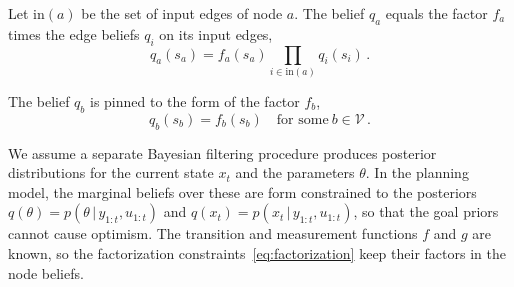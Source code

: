 \documentclass{l4dc2027}
\newcommand\given[1][]{\,#1\vert\,}
\begin{document}
\begin{definition}\label{def:factorization}
Let $\mathrm{in}(a)$ be the set of input edges of node $a$. The belief $q_a$ equals the factor $f_a$ times the edge beliefs $q_i$ on its input edges,
\begin{equation}\label{eq:factorization}
	q_a(s_a) = f_a(s_a) \prod_{i \in \mathrm{in}(a)} q_i(s_i) \, .
\end{equation}
\end{definition}
%
\begin{definition}\label{def:form}
The belief $q_b$ is pinned to the form of the factor $f_b$,
\begin{equation}\label{eq:form}
	q_b(s_b) = f_b(s_b)  \quad \text{for some} \ b \in \mathcal{V} \, .
\end{equation}
\end{definition}
%
We assume a separate Bayesian filtering procedure produces posterior distributions for the current state $x_t$ and the parameters $\theta$. In the planning model, the marginal beliefs over these are form constrained to the posteriors $q(\theta) = p(\theta \given y_{1:t}, u_{1:t})$ and $q(x_t) = p(x_t \given y_{1:t}, u_{1:t})$, so that the goal priors cannot cause optimism. The transition and measurement functions $f$ and $g$ are known, so the factorization constraints~\eqref{eq:factorization} keep their factors in the node beliefs.

\end{document}

